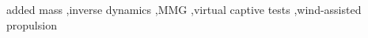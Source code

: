 \documentclass[preprint,11pt,authoryear]{elsarticle}
\begin{document}
\begin{frontmatter}

    \begin{abstract}
        

    \end{abstract}


    \begin{keyword}
    added mass \sep inverse dynamics \sep MMG \sep virtual captive tests \sep wind-assisted propulsion 



    \end{keyword}

\end{frontmatter}
\FloatBarrier
\end{document}
